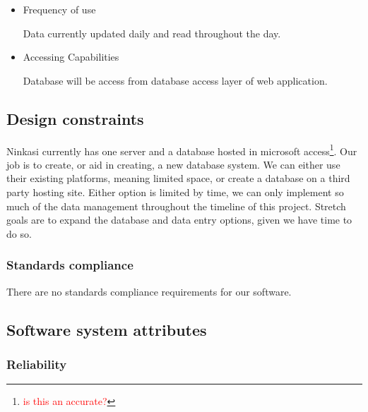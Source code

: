 \documentclass[draftclsnofoot,onecolumn,letterpaper,10pt,compsoc]{IEEEtran}
\newcommand\question[1]{\footnote{\textcolor{red}{#1}}}
\begin{document}
\begin{itemize}
\begin{itemize}
\begin{itemize}
                    \item{\textbf{pH}: pH level of batch in brewing vat.}
                    \item{\textbf{ABV}: Alcohol By Volumne of batch.}
                    \item{\textbf{Temp}: Temperature of batch.}
                    \item{\textbf{Action}: Action to be taken.}
                    \item{\textbf{By}:
                        \question{Is this the person taking the action?}
                    }
                \end{itemize}
            \end{itemize}
        \item{Frequency of use}

            Data currently updated daily and read throughout the day.

        \item{Accessing Capabilities}

            Database will be access from database access layer of web application.
    \end{itemize}

	\subsection{Design constraints}
		Ninkasi currently has one server and a database hosted in microsoft access\question{is this an accurate?}.
		Our job is to create, or aid in creating, a new database system.
		We can either use their existing platforms, meaning limited space, or create a database on a third party hosting site.
		Either option is limited by time, we can only implement so much of the data management throughout the timeline of this project.
		Stretch goals are to expand the database and data entry options, given we have time to do so.

		\subsubsection{Standards compliance}

		There are no standards compliance requirements for our software.

	\subsection{Software system attributes}
		\subsubsection{Reliability}
\end{document}
